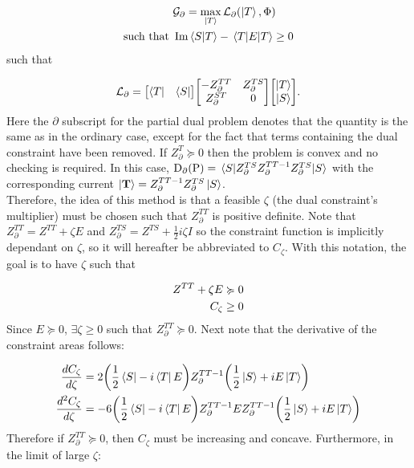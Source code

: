 \documentclass[reprint]{revtex4-2}
\begin{document}
\begin{align}
	&\mathcal{G}_\partial = \max_{\ket{T}}\mathcal{L}_\partial\qty(\ket{T}, \Phi)\\
	\text{such that } &\Im\braket{S}{T} - \ev{E}{T}\ge 0 \notag
\end{align}
such that

\begin{align}
	\mathcal{L}_\partial = \mqty[\bra{T} & \bra{S}]\mqty[-Z^{TT}_\partial & Z^{TS}_\partial \\ Z^{ST}_\partial & 0]\mqty[\ket{T} \\ \ket{S}].
\end{align}
Here the $\partial$ subscript for the partial dual problem denotes that the quantity is the same as in the ordinary case, except for the fact that terms containing the dual constraint have been removed. If $Z^{T}_\partial\succcurlyeq 0$ then the problem is convex and no checking is required. In this case, $\text{D}_\partial(\text{P}) = \ev{Z^{TS}_\partial Z^{TT-1}_\partial Z^{TS}_\partial}{S}$ with the corresponding current $\ket{\vb{T}} = Z^{TT-1}_\partial Z^{TS}_\partial\ket{S}$.\\

Therefore, the idea of this method is that a feasible $\zeta$ (the dual constraint's multiplier) must be chosen such that $Z^{TT}_\partial$ is positive definite. Note that $Z^{TT}_\partial = Z^{TT} + \zeta E$ and $Z^{TS}_\partial = Z^{TS} + \frac{1}{2}i\zeta I$ so the constraint function is implicitly dependant on $\zeta$, so it will hereafter be abbreviated to $C_\zeta$. With this notation, the goal is to have $\zeta$ such that

\begin{align}
	Z^{TT}+\zeta E&\succcurlyeq0\\
	C_\zeta&\ge0 \notag
\end{align}
Since $E\succcurlyeq0$, $\exists\zeta\ge0$ such that $Z^{TT}_\partial\succcurlyeq0$. Next note that the derivative of the constraint areas follows:

\begin{align*}
	\frac{dC_\zeta}{d\zeta} &= 2\qty(\frac{1}{2}\bra{S} - i\bra{T}E)Z^{TT-1}_\partial\qty(\frac{1}{2}\ket{S}+ iE\ket{T})\\
	\frac{d^2C_\zeta}{d\zeta} &= -6\qty(\frac{1}{2}\bra{S} - i\bra{T}E)Z^{TT-1}_\partial E Z^{TT-1}_\partial\qty(\frac{1}{2}\ket{S}+ iE\ket{T})
\end{align*}
Therefore if $Z^{TT}_\partial\succcurlyeq0$, then $C_\zeta$ must be increasing and concave. Furthermore, in the limit of large $\zeta$:
\end{document}
